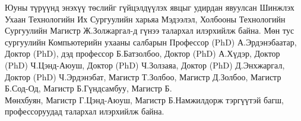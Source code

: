 
\begin{acknowledgements}
\addchaptertocentry{\acknowledgementname}

Юуны түрүүнд энэхүү төслийг гүйцэлдүүлэх явцыг удирдан явуулсан Шинжлэх Ухаан Технологийн Их Сургуулийн харьяа Мэдээлэл, Холбооны Технологийн Сургуулийн Магистр Ж.Золжаргал-д гүнээ талархал илэрхийлж байна. Мөн тус сургуулийн Компьютерийн ухааны салбарын Профессор (PhD) А.Эрдэнэбаатар, Доктор (PhD), дэд профессор Б.Батзолбоо, Доктор (PhD) А.Хүдэр, Доктор (PhD) Ч.Цэнд-Аюуш, Доктор (PhD) Ч.Золзаяа, Доктор (PhD) Д.Энхжаргал, Доктор (PhD) Ч.Эрдэнэбат, Магистр Т.Золбоо, Магистр Д.Золбоо, Магистр Б.Сод-Од, Магистр Б.Гүндсамбуу, Магистр Б.\\Мөнхбуян, Магистр Г.Цэнд-Аюуш, Магистр Б.Намжилдорж тэргүүтэй багш, профессоруудад талархал илэрхийлж байна.

\end{acknowledgements}

